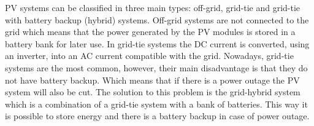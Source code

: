 PV systems can be classified in three main types: off-grid, grid-tie and grid-tie with battery backup (hybrid) systems. Off-grid systems are not connected to the grid which means that the power generated by the PV modules is stored in a battery bank for later use. In grid-tie systems the DC current is converted, using an inverter, into an AC current compatible with the grid. Nowadays, grid-tie systems are the most common, however, their main disadvantage is that they do not have battery backup. Which means that if there is a power outage the PV system will also be cut.  The solution to this problem is the grid-hybrid system which is a combination of a grid-tie system with a bank of batteries. This way it is possible to store energy and there is a battery backup in case of power outage. %
